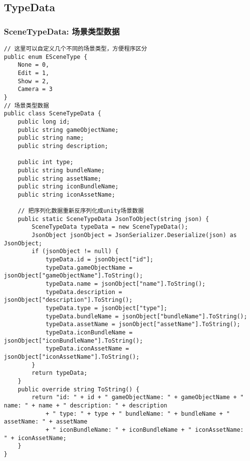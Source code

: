 \documentclass[9pt, b5paper]{article}
\begin{document}
\subsection{TypeData}
\label{sec-2-2}
\subsubsection{SceneTypeData: 场景类型数据}
\label{sec-2-2-1}
\begin{verbatim}
// 这里可以自定义几个不同的场景类型，方便程序区分
public enum ESceneType {
    None = 0,
    Edit = 1,
    Show = 2,
    Camera = 3
}
// 场景类型数据
public class SceneTypeData {
    public long id;
    public string gameObjectName;
    public string name;
    public string description;

    public int type;
    public string bundleName;
    public string assetName;
    public string iconBundleName;
    public string iconAssetName;

    // 把序列化数据重新反序列化成unity场景数据
    public static SceneTypeData JsonToObject(string json) {
        SceneTypeData typeData = new SceneTypeData();
        JsonObject jsonObject = JsonSerializer.Deserialize(json) as JsonObject;
        if (jsonObject != null) {
            typeData.id = jsonObject["id"];
            typeData.gameObjectName = jsonObject["gameObjectName"].ToString();
            typeData.name = jsonObject["name"].ToString();
            typeData.description = jsonObject["description"].ToString();
            typeData.type = jsonObject["type"];
            typeData.bundleName = jsonObject["bundleName"].ToString();
            typeData.assetName = jsonObject["assetName"].ToString();
            typeData.iconBundleName = jsonObject["iconBundleName"].ToString();
            typeData.iconAssetName = jsonObject["iconAssetName"].ToString();
        }
        return typeData;
    }
    public override string ToString() {
        return "id: " + id + " gameObjectName: " + gameObjectName + " name: " + name + " description: " + description
            + " type: " + type + " bundleName: " + bundleName + " assetName: " + assetName
            + " iconBundleName: " + iconBundleName + " iconAssetName: " + iconAssetName;
    }
}
\end{verbatim}
\end{document}
